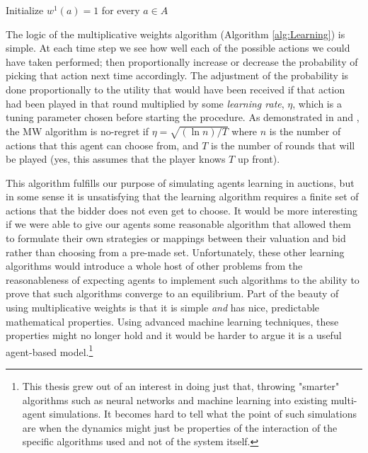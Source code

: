\documentclass[12pt,twoside]{reedthesis}
\begin{document}
\begin{algorithm}[H]
	Initialize $w^1(a) = 1$ for every $a\in A$\\
\label{alg:Learning}
\end{algorithm}
\vspace{1cm}
The logic of the multiplicative weights algorithm (Algorithm \ref{alg:Learning}) is simple. At each time step we see how well each of the possible actions we could have taken performed; then proportionally increase or decrease the probability of picking that action next time accordingly. The adjustment of the probability is done proportionally to the utility that would have been received if that action had been played in that round multiplied by some \textit{learning rate}, $\eta$, which is a tuning parameter chosen before starting the procedure. As demonstrated in \cite{Roughgarden2016} and \cite{Blum2007}, the MW algorithm is no-regret if $\eta = \sqrt{(\ln n) / T}$ where $n$ is the number of actions that this agent can choose from, and $T$ is the number of rounds that will be played (yes, this assumes that the player knows $T$ up front).

This algorithm fulfills our purpose of simulating agents learning in auctions, but in some sense it is unsatisfying that the learning algorithm requires a finite set of actions that the bidder does not even get to choose. It would be more interesting if we were able to give our agents some reasonable algorithm that allowed them to formulate their own strategies or mappings between their valuation and bid rather than choosing from a pre-made set. Unfortunately, these other learning algorithms would introduce a whole host of other problems from the reasonableness of expecting agents to implement such algorithms to the ability to prove that such algorithms converge to an equilibrium. Part of the beauty of using multiplicative weights is that it is simple {\em and} has nice, predictable mathematical properties. Using advanced machine learning techniques, these properties might no longer hold and it would be harder to argue it is a useful agent-based model.\footnote{This thesis grew out of an interest in doing just that, throwing "smarter" algorithms such as neural networks and machine learning into existing multi-agent simulations. It becomes hard to tell what the point of such simulations are when the dynamics might just be properties of the interaction of the specific algorithms used and not of the system itself.}
\end{document}
